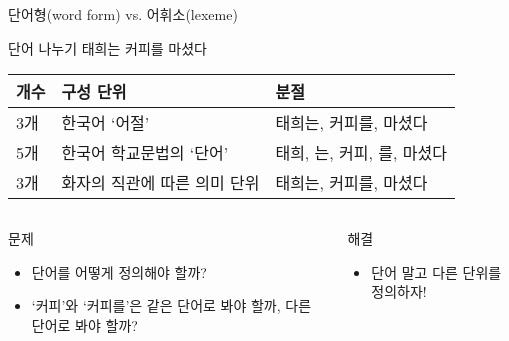 \documentclass[11pt, aspectratio=169]{beamer}
\begin{document}
\begin{frame}[t]{단어형(word form) vs. 어휘소(lexeme)}
  \begin{block}{단어 나누기}
    태희는 커피를 마셨다
    \begin{center}
      \begin{tabular}{lll}
        \hline
        \textbf{개수} & \textbf{구성 단위} & \textbf{분절} \\
        \hline
        3개 & 한국어 ‘어절’ & 태희는, 커피를, 마셨다\\
        5개 & 한국어 학교문법의 ‘단어’ & 태희, 는, 커피, 를, 마셨다\\
        3개 & 화자의 직관에 따른 의미 단위 & 태희는, 커피를, 마셨다 \\
        \hline
      \end{tabular}    
    \end{center}
  \end{block}
  \begin{columns}
    \begin{column}[T]{0.46\textwidth}
    문제
      \begin{itemize}
        \item 단어를 어떻게 정의해야 할까?
        \item ‘커피’와 ‘커피를’은 같은 단어로 봐야 할까, 다른 단어로 봐야 할까?
      \end{itemize}      
    \end{column}
    \begin{column}[T]{0.47\textwidth}
    해결
      \begin{itemize}
        \item 단어 말고 다른 단위를 정의하자!
      \end{itemize}      
    \end{column}
  \end{columns}
\end{frame}
\end{document}
